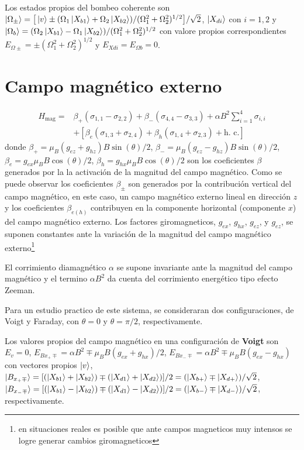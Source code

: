 \documentclass[../main.tex]{subfiles}
\begin{document}
Los estados propios del bombeo coherente son $|\Omega_\pm\rangle = \big[\ket{v} \pm (\Omega_1 \ket{X_{b1}} + \Omega_2 \ket{X_{b2}})/(\Omega_1^2 + \Omega_2^2)^{1/2} \big]/\sqrt{2}$, $\ket{X_{di}}$ con $i=1,2$ y $\ket{\Omega_b} = (\Omega_2 \ket{X_{b1}} - \Omega_1 \ket{X_{b2}})/(\Omega_1^2 + \Omega_2^2)^{1/2}$ con valore propios correspondientes $E_{\Omega\pm} = \pm(\Omega_1^2+\Omega_2^2)^{1/2}$ y $E_{Xdi} = E_{\Omega b} = 0$.
\section{Campo magnético externo}
\begin{align*}
	H_\text{mag} =& \beta_+ (\sigma_{1, 1} - \sigma_{2, 2}) + \beta_- (\sigma_{4, 4} - \sigma_{3, 3}) + \alpha B^2 \sum_{i = 1}^{4} \sigma_{i, i}\\ &+ [\beta_e (\sigma_{1, 3} + \sigma_{2, 4}) + \beta_h (\sigma_{1, 4} + \sigma_{2, 3}) + \text{h. c.}]
\end{align*}
donde $\beta_+ = \mu_B (g_{ez} + g_{hz}) B \sin(\theta)/2$, $\beta_- = \mu_B (g_{ez}-g_{hz}) B \sin(\theta)/2$, $\beta_e = g_{ex} \mu_B B \cos(\theta)/2$, $\beta_h = g_{hx} \mu_B B \cos(\theta)/2$ son los coeficientes $\beta$ generados por la la activación de la magnitud del campo magnético. Como se puede observar los coeficientes $\beta_\pm$ son generados por la contribución vertical del campo magnético, en este caso, un campo magnético externo lineal en dirección $z$ y los coeficientes $\beta_{e(h)}$ contribuyen en la componente horizontal (componente $x$) del campo magnético externo. Los factores giromagneticos, $g_{ex}$, $g_{hx}$, $g_{ez}$, y $g_{ez}$, se suponen constantes ante la variación de la magnitud del campo magnético externo\footnote{en situaciones reales es posible que ante campos magneticos muy intensos se logre generar cambios giromagneticos}

El corrimiento diamagnético $\alpha$ se supone invariante ante la magnitud del campo magnético y el termino $\alpha B^2$ da cuenta del corrimiento energético tipo efecto Zeeman.

Para un estudio practico de este sistema, se consideraran dos configuraciones, de Voigt y Faraday, con $\theta=0$ y $\theta=\pi/2$, respectivamente. 

Los valores propios del campo magnético en una configuración de \textbf{Voigt} son $E_v=0$, $E_{Bx_+\mp} = \alpha B^2 \mp \mu_B B(g_{ex}+g_{hx})/2$, $E_{Bx_-\mp} = \alpha B^2 \mp \mu_B B (g_{ex} - g_{hx})$ con vectores propios $\ket{v}$, $\ket{B_{x_+\mp}} = [(\ket{X_{b1}}+\ket{X_{b2}}) \mp (\ket{X_{d1}}+\ket{X_{d2}})]/2 = (\ket{X_{b+}} \mp \ket{X_{d+}})/\sqrt{2}$, $\ket{B_{x_-\mp}} = [(\ket{X_{b1}}-\ket{X_{b2}}) \mp (\ket{X_{d1}}-\ket{X_{d2}})]/2 = (\ket{X_{b-}} \mp \ket{X_{d-}})/\sqrt{2}$, respectivamente.
\end{document}

